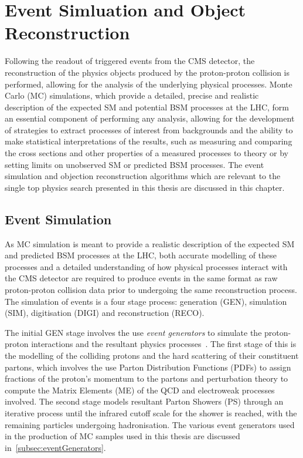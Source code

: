 \chapter{Event Simluation and Object Reconstruction}\label{chapter:data-mc}
Following the readout of triggered events from the CMS detector, the reconstruction of the physics objects produced by the proton-proton collision is performed, allowing for the analysis of the underlying physical processes.
Monte Carlo (MC) simulations, which provide a detailed, precise and realistic description of the expected SM and potential BSM processes at the LHC, form an essential component of performing any analysis, allowing for the development of strategies to extract processes of interest from backgrounds and the ability to make statistical interpretations of the results, such as measuring and comparing the cross sections and other properties of a measured processes to theory or by setting limits on unobserved SM or predicted BSM processes.
The event simulation and objection reconstruction algorithms which are relevant to the single top physics search presented in this thesis are discussed in this chapter.

\section{Event Simulation}\label{sec:sim}
As MC simulation is meant to provide a realistic description of the expected SM and predicted BSM processes at the LHC, 
both accurate modelling of these processes and a detailed understanding of how physical processes interact with the CMS detector are required to produce events in the same format as raw proton-proton collision data prior to undergoing the same reconstruction process.
The simulation of events is a four stage process: generation (GEN), simulation (SIM), digitisation (DIGI) and reconstruction (RECO).

The initial GEN stage involves the use \emph{event generators} to simulate the proton-proton interactions and the resultant physics processes~\cite{Buckley:2011ms,Hoche:2014rga}.
The first stage of this is the modelling of the colliding protons and the hard scattering of their constituent partons, which involves the use Parton Distribution Functions (PDFs) to assign fractions of the proton's momentum to the partons and perturbation theory to compute the Matrix Elements (ME) of the QCD and electroweak processes involved.
The second stage models resultant Parton Showers (PS) through an iterative process until the infrared cutoff scale for the shower is reached, with the remaining particles undergoing hadronisation.
The various event generators used in the production of MC samples used in this thesis are discussed in~\ref{subsec:eventGenerators}.

